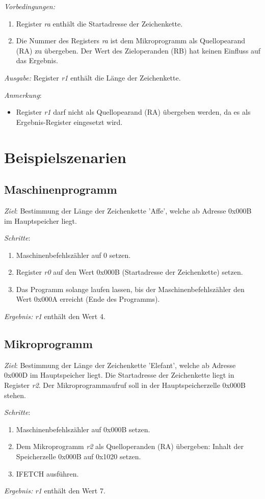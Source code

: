 \documentclass[12pt,a4paper]{article}
\begin{document}
\emph{Vorbedingungen:}
\begin {enumerate}
\item Register \emph{ra} enthält die Startadresse der Zeichenkette.
\item Die Nummer des Registers \emph{ra} ist dem Mikroprogramm als Quellopearand (RA) zu übergeben. Der Wert des Zieloperanden (RB) hat keinen Einfluss auf das Ergebnis. 
\end{enumerate}

\emph{Ausgabe:} Register \emph{r1} enthält die Länge der Zeichenkette.

\vspace{0.3cm}
\emph{Anmerkung}:
\begin {itemize}
\item Register \emph{r1} darf nicht als Quellopearand (RA) übergeben werden, da es als Ergebnis-Register eingesetzt wird.
\end{itemize}

\section{Beispielszenarien}

\subsection{Maschinenprogramm}
\emph{Ziel}: Bestimmung der Länge der Zeichenkette 'Affe', welche ab Adresse 0x000B im Hauptspeicher liegt.

\emph{Schritte}:

\begin {enumerate}
\item Maschinenbefehlszähler auf 0 setzen.
\item Register \emph{r0} auf den Wert 0x000B (Startadresse der Zeichenkette) setzen.
\item Das Programm solange laufen lassen, bis der Maschinenbefehlszähler den Wert 0x000A erreicht (Ende des Programms).
\end{enumerate}

\emph{Ergebnis:} \emph{r1} enthält den Wert 4.

\subsection{Mikroprogramm}

\emph{Ziel}: Bestimmung der Länge der Zeichenkette 'Elefant', welche ab Adresse 0x000D im Hauptspeicher liegt. Die Startadresse der Zeichenkette liegt in Register \emph{r2}. Der Mikroprogrammaufruf soll in der Hauptspeicherzelle 0x000B stehen.

\emph{Schritte}:

\begin {enumerate}
\item Maschinenbefehlszähler auf 0x000B setzen.
\item Dem Mikroprogramm \emph{r2} als Quelloperanden (RA) übergeben: Inhalt der Speicherzelle 0x000B auf 0x1020 setzen.
\item IFETCH ausführen.
\end{enumerate}

\emph{Ergebnis:} \emph{r1} enthält den Wert 7.
\end{document}
